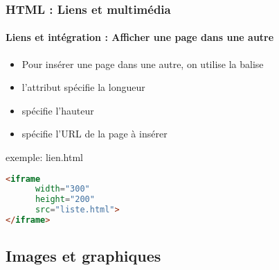 \documentclass[xcolor=table]{beamer}
\begin{document}
\begin{frame}[fragile]
\frametitle{HTML : Liens et multimédia}
\framesubtitle{Liens et intégration : Afficher une page dans une autre}

\begin{minipage}{0.50\textwidth} 
	\begin{itemize}
		\item Pour insérer une page dans une autre, on utilise la balise 
		\item l'attribut  spécifie la longueur 
		\item {} spécifie l'hauteur 
		\item {} spécifie l'URL de la page à insérer
	\end{itemize}
\end{minipage}
%
\begin{minipage}{0.49\textwidth}
\begin{exampleblock}{exemple: lien.html}
\lstset{escapeinside=**}
\scriptsize\bfseries\vspace{-6pt}
\begin{lstlisting}[language={html}]
<iframe 
      width="300" 
      height="200" 
      src="liste.html">
</iframe>	
\end{lstlisting}\vspace{-6pt}
\end{exampleblock}
\end{minipage}

\end{frame}

\subsection{Images et graphiques}
\end{document}
